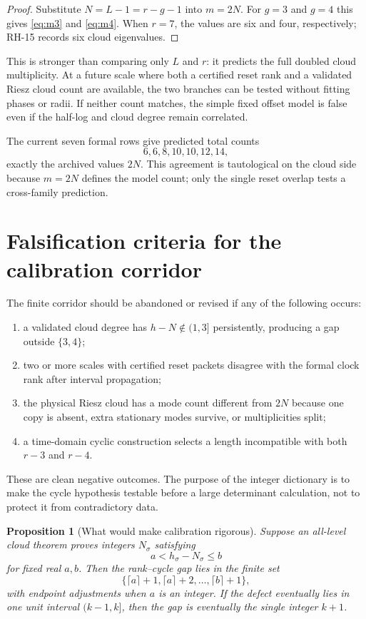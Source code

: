\documentclass[12pt]{article}
\newtheorem{proposition}[theorem]{Proposition}
\theoremstyle{remark}
\begin{document}
\begin{proof}
Substitute $N=L-1=r-g-1$ into $m=2N$.  For $g=3$ and $g=4$ this gives
\eqref{eq:m3} and \eqref{eq:m4}.  When $r=7$, the values are six and four,
respectively; RH-15 records six cloud eigenvalues.
\end{proof}

This is stronger than comparing only $L$ and $r$: it predicts the full doubled
cloud multiplicity.  At a future scale where both a certified reset rank and
a validated Riesz cloud count are available, the two branches can be tested
without fitting phases or radii.  If neither count matches, the simple fixed
offset model is false even if the half-log and cloud degree remain correlated.

The current seven formal rows give predicted total counts
\[
 6,6,8,10,10,12,14,
\]
exactly the archived values $2N$.  This agreement is tautological on the
cloud side because $m=2N$ defines the model count; only the single reset
overlap tests a cross-family prediction.

\section{Falsification criteria for the calibration corridor}

The finite corridor should be abandoned or revised if any of the following
occurs:
\begin{enumerate}[leftmargin=2em]
\item a validated cloud degree has $h-N\notin(1,3]$ persistently, producing a
gap outside $\{3,4\}$;
\item two or more scales with certified reset packets disagree with the
formal clock rank after interval propagation;
\item the physical Riesz cloud has a mode count different from $2N$ because
one copy is absent, extra stationary modes survive, or multiplicities split;
\item a time-domain cyclic construction selects a length incompatible with
both $r-3$ and $r-4$.
\end{enumerate}
These are clean negative outcomes.  The purpose of the integer dictionary is
to make the cycle hypothesis testable before a large determinant calculation,
not to protect it from contradictory data.

\begin{proposition}[What would make calibration rigorous]
Suppose an all-level cloud theorem proves integers $N_\sigma$ satisfying
\[
 a<h_\sigma-N_\sigma\le b
\]
for fixed real $a,b$.  Then the rank--cycle gap lies in the finite set
\[
 \{\lceil a\rceil+1,\lceil a\rceil+2,
 \ldots,\lceil b\rceil+1\},
\]
with endpoint adjustments when $a$ is an integer.  If the defect eventually
lies in one unit interval $(k-1,k]$, then the gap is eventually the single
integer $k+1$.
\end{proposition}
\end{document}
